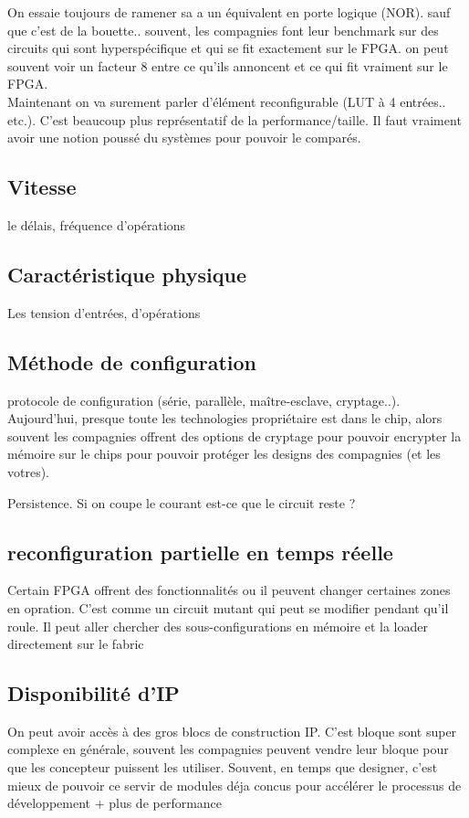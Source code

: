 \documentclass[oneside]{book}
\begin{document}
        On essaie toujours de ramener sa a un équivalent en porte logique (NOR). sauf que c'est de la bouette.. souvent, les compagnies font leur benchmark sur des circuits qui sont hyperspécifique et qui se fit exactement sur le FPGA. on peut souvent voir un facteur 8 entre ce qu'ils annoncent et ce qui fit vraiment sur le FPGA.\\
        
        Maintenant on va surement parler d'élément reconfigurable (LUT à 4 entrées.. etc.). C'est beaucoup plus représentatif de la performance/taille. Il faut vraiment avoir une notion poussé du systèmes pour pouvoir le comparés.
        \subsection{Vitesse}
        le délais, fréquence d'opérations
        \subsection{Caractéristique physique}
        Les tension d'entrées, d'opérations
        \subsection{Méthode de configuration}
        protocole de configuration (série, parallèle, maître-esclave, cryptage..).\\
        
        Aujourd'hui, presque toute les technologies propriétaire est dans le chip, alors souvent les compagnies offrent des options de cryptage pour pouvoir encrypter la mémoire sur le chips pour pouvoir protéger les designs des compagnies (et les votres).
        
        Persistence. Si on coupe le courant est-ce que le circuit reste ?
        \subsection{reconfiguration partielle en temps réelle}
        Certain FPGA offrent des fonctionnalités ou il peuvent changer certaines zones en opration. C'est comme un circuit mutant qui peut se modifier pendant qu'il roule. Il peut aller chercher des sous-configurations en mémoire et la loader directement sur le fabric\\
        \subsection{Disponibilité d'IP}
        On peut avoir accès à des gros blocs de construction IP. C'est bloque sont super complexe en générale, souvent les compagnies peuvent vendre leur bloque pour que les concepteur puissent les utiliser. Souvent, en temps que designer, c'est mieux de pouvoir ce servir de modules déja concus pour accélérer le processus de développement + plus de performance
\end{document}
